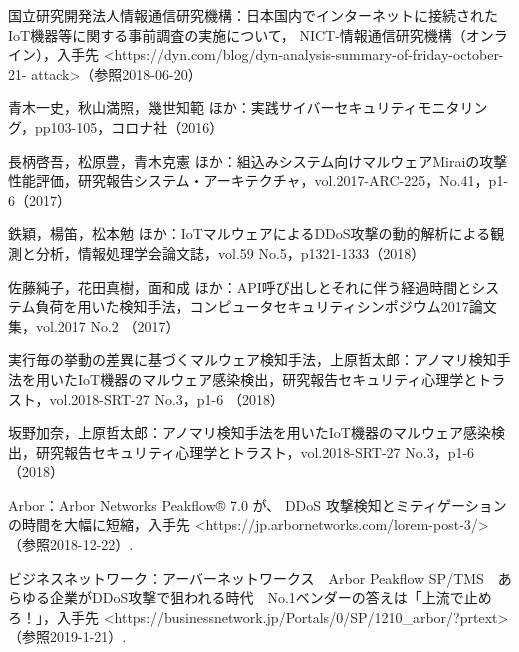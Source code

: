 \begin{thebibliography}{30}
        国立研究開発法人情報通信研究機構：日本国内でインターネットに接続されたIoT機器等に関する事前調査の実施について， NICT-情報通信研究機構（オンライン），入手先 \textless https:\slash\slash{}dyn.com\slash{}blog\slash{}dyn-analysis-summary-of-friday-october-21-
        attack\textgreater （参照2018-06-20）
        
        青木一史，秋山満照，幾世知範 ほか：実践サイバーセキュリティモニタリング，pp103-105，コロナ社（2016）
    

        
    
        長柄啓吾，松原豊，青木克憲 ほか：組込みシステム向けマルウェアMiraiの攻撃性能評価，研究報告システム・アーキテクチャ，vol.2017-ARC-225，No.41，p1-6（2017）
    
        鉄穎，楊笛，松本勉 ほか：IoTマルウェアによるDDoS攻撃の動的解析による観測と分析，情報処理学会論文誌，vol.59 No.5，p1321-1333（2018）

        佐藤純子，花田真樹，面和成 ほか：API呼び出しとそれに伴う経過時間とシステム負荷を用いた検知手法，コンピュータセキュリティシンポジウム2017論文集，vol.2017 No.2 （2017）

        実行毎の挙動の差異に基づくマルウェア検知手法，上原哲太郎：アノマリ検知手法を用いたIoT機器のマルウェア感染検出，研究報告セキュリティ心理学とトラスト，vol.2018-SRT-27 No.3，p1-6 （2018）

        坂野加奈，上原哲太郎：アノマリ検知手法を用いたIoT機器のマルウェア感染検出，研究報告セキュリティ心理学とトラスト，vol.2018-SRT-27 No.3，p1-6 （2018）

         Arbor：Arbor Networks Peakflow® 7.0 が、 DDoS 攻撃検知とミティゲーションの時間を大幅に短縮，入手先 \textless https:\slash\slash{}jp.arbornetworks.com\slash{}lorem-post-3\slash{}\textgreater （参照2018-12-22）.
    
         ビジネスネットワーク：アーバーネットワークス　Arbor Peakflow SP/TMS　あらゆる企業がDDoS攻撃で狙われる時代　No.1ベンダーの答えは「上流で止めろ！」，入手先 \textless https:\slash\slash{}businessnetwork.jp\slash{}Portals\slash{}0\slash{}SP\slash{}1210\_arbor\slash{}?prtext\textgreater （参照2019-1-21）.


\end{thebibliography}
